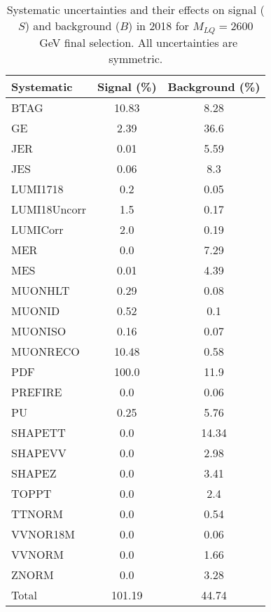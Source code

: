 \begin{table}[htbp]
\begin{center}
\caption{Systematic uncertainties and their effects on signal ($S$) and background ($B$) in 2018 for $M_{LQ}=2600$~GeV final selection. All uncertainties are symmetric.}
\begin{tabular}{lcc}
\hline\hline
Systematic & Signal (\%) & Background (\%) \\ \hline 
BTAG & 10.83 & 8.28\\ 
GE & 2.39 & 36.6\\ 
JER & 0.01 & 5.59\\ 
JES & 0.06 & 8.3\\ 
LUMI1718 & 0.2 & 0.05\\ 
LUMI18Uncorr & 1.5 & 0.17\\ 
LUMICorr & 2.0 & 0.19\\ 
MER & 0.0 & 7.29\\ 
MES & 0.01 & 4.39\\ 
MUONHLT & 0.29 & 0.08\\ 
MUONID & 0.52 & 0.1\\ 
MUONISO & 0.16 & 0.07\\ 
MUONRECO & 10.48 & 0.58\\ 
PDF & 100.0 & 11.9\\ 
PREFIRE & 0.0 & 0.06\\ 
PU & 0.25 & 5.76\\ 
SHAPETT & 0.0 & 14.34\\ 
SHAPEVV & 0.0 & 2.98\\ 
SHAPEZ & 0.0 & 3.41\\ 
TOPPT & 0.0 & 2.4\\ 
TTNORM & 0.0 & 0.54\\ 
VVNOR18M & 0.0 & 0.06\\ 
VVNORM & 0.0 & 1.66\\ 
ZNORM & 0.0 & 3.28\\ 
Total & 101.19 & 44.74\\ \hline \hline
\end{tabular}
\label{tab:SysUncertainties_uujj_2600}
\end{center}
\end{table}

